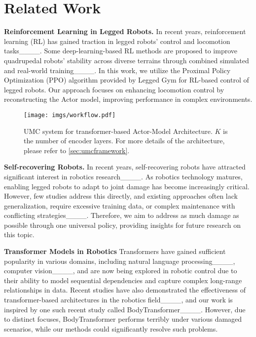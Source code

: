 \section{Related Work}
\label{sec:relworks}

\textbf{Reinforcement Learning in Legged Robots.}
In recent years, reinforcement learning (RL) has gained traction in legged robots' control and locomotion tasks____. Some deep-learning-based RL methods are proposed to improve quadrupedal robots' stability across diverse terrains through combined simulated and real-world training____. In this work, we utilize the Proximal Policy Optimization (PPO) algorithm provided by Legged Gym for RL-based control of legged robots. Our approach focuses on enhancing locomotion control by reconstructing the Actor model, improving performance in complex environments.

\begin{figure*}
  \centering
  \texttt{[image: imgs/workflow.pdf]}
  \vspace{-2mm}
  \caption{UMC system for transformer-based Actor-Model Architecture. \( K \) is the number of encoder layers. For more details of the architecture, please refer to \cref{sec:umcframework}.}
  \vspace{-5mm}
  \label{fig:trf_model}
\end{figure*}


\textbf{Self-recovering Robots.}
In recent years, self-recovering robots have attracted significant interest in robotics research____. As robotics technology matures, enabling legged robots to adapt to joint damage has become increasingly critical. However, few studies address this directly, and existing approaches often lack generalization, require excessive training data, or complex maintenance with conflicting strategies____. Therefore, we aim to address as much damage as possible through one universal policy, providing insights for future research on this topic.


\textbf{Transformer Models in Robotics}
Transformers have gained sufficient popularity in various domains, including natural language processing____, computer vision____, and are now being explored in robotic control due to their ability to model sequential dependencies and capture complex long-range relationships in data. Recent studies have also demonstrated the effectiveness of transformer-based architectures in the robotics field____, and our work is inspired by one such recent study called BodyTransformer____. However, due to distinct focuses, BodyTransformer performs terribly under various damaged scenarios, while our methods could significantly resolve such problems.